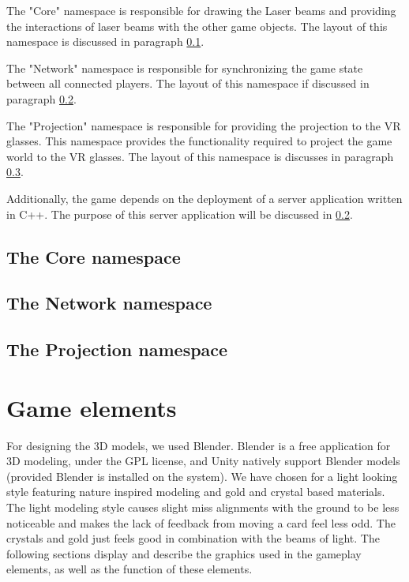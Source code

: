 		The "Core" namespace is responsible for drawing the Laser beams and
		providing the interactions of laser beams with the other game objects.
		The layout of this namespace is discussed in paragraph 
		\ref{ssec:corenamespace}.

		The "Network" namespace is responsible for synchronizing the game state
		between all connected players. The layout of this namespace if discussed 
		in paragraph \ref{ssec:networknamespace}.

		The "Projection" namespace is responsible for providing the projection to
		the VR glasses. This namespace provides the functionality required to project
		the game world to the VR glasses. The layout of this namespace is discusses in
		paragraph \ref{ssec:projectionnamespace}.
		
		Additionally, the game depends on the deployment of a server application written
		in C++. The purpose of this server application will be discussed in
		\ref{ssec:networknamespace}.
		
		\subsection{The Core namespace} \label{ssec:corenamespace}
			
		\subsection{The Network namespace} \label{ssec:networknamespace}
					
		\subsection{The Projection namespace} \label{ssec:projectionnamespace}

	\section{Game elements} \label{sec:graphicaldesign}
		For designing the 3D models, we used Blender. Blender is a free application
		for 3D modeling, under the GPL license, and Unity natively support Blender models (provided Blender is installed on the system). We have chosen for a light looking style featuring nature inspired modeling and gold and crystal based materials. The light modeling style causes slight miss alignments with the ground to be less noticeable and makes the lack of feedback from moving a card feel less odd. The crystals and gold 
		just feels good in combination with the beams of light.
		The following sections display and describe the graphics used in
		the gameplay elements, as well as the function of
		these elements.
		
